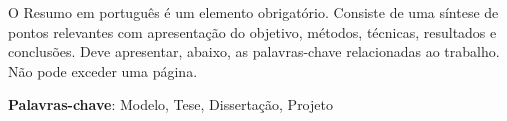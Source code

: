 O Resumo em português é um elemento obrigatório. Consiste de uma síntese de pontos relevantes com apresentação do objetivo, métodos, técnicas, resultados e conclusões. Deve apresentar, abaixo, as palavras-chave relacionadas ao trabalho. Não pode exceder uma página.

   \vspace{\onelineskip}
 
   \noindent 
 \textbf{Palavras-chave}: Modelo, Tese, Dissertação, Projeto
